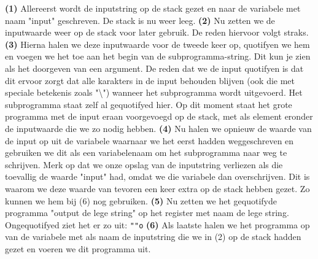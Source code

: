 \textbf{(1)} Allereerst wordt de inputstring op de stack gezet en naar de
variabele met naam "input" geschreven. De stack is nu weer leeg. \textbf{(2)}
Nu zetten we de inputwaarde weer op de stack voor later gebruik. De reden
hiervoor volgt straks.  \textbf{(3)} Hierna halen we deze inputwaarde voor de
tweede keer op, quotifyen we hem en voegen we het toe aan het begin van de
subprogramma-string. Dit kun je zien als het doorgeven van een argument. De
reden dat we de input quotifyen is dat dit ervoor zorgt dat alle karakters in
de input behouden blijven (ook die met speciale betekenis zoals
"\textbackslash{}") wanneer het subprogramma wordt uitgevoerd. Het subprogramma
staat zelf al gequotifyed hier.  Op dit moment staat het grote programma met de
input eraan voorgevoegd op de stack, met als element eronder de inputwaarde die
we zo nodig hebben. \textbf{(4)} Nu halen we opnieuw de waarde van de input op
uit de variabele waarnaar we het eerst hadden weggeschreven en gebruiken we dit
als een variabelenaam om het subprogramma naar weg te schrijven. Merk op dat we
onze opslag van de inputstring verliezen als die toevallig de waarde "input"
had, omdat we die variabele dan overschrijven. Dit is waarom we deze waarde van
tevoren een keer extra op de stack hebben gezet. Zo kunnen we hem bij (6) nog
gebruiken. \textbf{(5)} Nu zetten we het gequotifyde programma "output de lege
string" op het register met naam de lege string. Ongequotifyed ziet het er zo
uit: \texttt{""o} \textbf{(6)} Als laatste halen we het programma op van de
variabele met als naam de inputstring die we in (2) op de stack hadden gezet en
voeren we dit programma uit.
